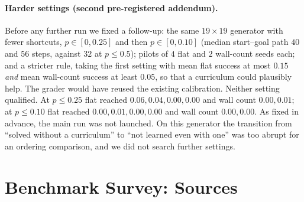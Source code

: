 \documentclass[twoside]{article}
\begin{document}
\paragraph{Harder settings (second pre-registered addendum).} Before any further run we fixed a follow-up: the same $19\times19$ generator with fewer shortcuts, $p\in[0,0.25]$ and then $p\in[0,0.10]$ (median start--goal path $40$ and $56$ steps, against $32$ at $p\le0.5$); pilots of $4$ flat and $2$ wall-count seeds each; and a stricter rule, taking the first setting with mean flat success at most $0.15$ \emph{and} mean wall-count success at least $0.05$, so that a curriculum could plausibly help. The grader would have reused the existing calibration. Neither setting qualified. At $p\le0.25$ flat reached $0.06, 0.04, 0.00, 0.00$ and wall count $0.00, 0.01$; at $p\le0.10$ flat reached $0.00, 0.01, 0.00, 0.00$ and wall count $0.00, 0.00$. As fixed in advance, the main run was not launched. On this generator the transition from ``solved without a curriculum'' to ``not learned even with one'' was too abrupt for an ordering comparison, and we did not search further settings.

\section{Benchmark Survey: Sources}
\label{app:survey}
\end{document}
